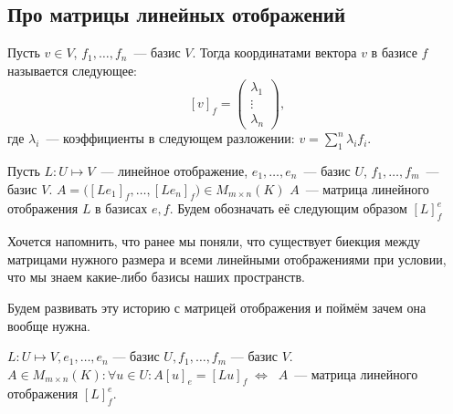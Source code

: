 \subsection{Про матрицы линейных отображений}
\begin{definition}
    Пусть $v\in V$,  $f_1,\dots, f_n$~--- базис $V$.
    Тогда координатами вектора $v$ в базисе $f$ называется следующее: 
    \[
        [v]_f =
        \begin{pmatrix}
            \lambda_1\\ \vdots\\ \lambda_n
        \end{pmatrix},
    \]
     где $\lambda_i$~--- коэффициенты в следующем разложении:
    $v = \sum\limits_{1}^{n}{\lambda_if_i}$.
\end{definition}
\begin{definition}
    \label{def:Матрица отображения}
    Пусть $L: U\mapsto V$~--- линейное отображение, $e_1,\dots, e_n$~--- базис $U$, 
    $f_1,\dots, f_m$~--- базис $V$. $A = \Big([Le_1]_f, \dots, [Le_n]_f\Big)\in M_{m\times n}(K)$
    $A$~--- матрица линейного отображения $L$ в базисах $e, f$.
    Будем обозначать её следующим образом $[L]_f^e$
\end{definition}
\begin{remark}
    Хочется напомнить, что ранее мы поняли, что существует биекция между
    матрицами нужного размера и всеми линейными отображениями при условии, что мы
    знаем какие-либо базисы наших пространств.
\end{remark}
\begin{motivation}
    Будем развивать эту историю с матрицей отображения и поймём зачем она вообще нужна.
\end{motivation}
\begin{statement}
    $L: U\mapsto V, e_1,\dots, e_n\text{~--- базис }U, f_1,\dots, f_m\text{~--- базис }V$.
    $A \in M_{m\times n}(K)\colon \forall u\in U\colon A[u]_e = [Lu]_f\; \Leftrightarrow \;\; A$~--- матрица линейного отображения $[L]^e_f$.
\end{statement}
